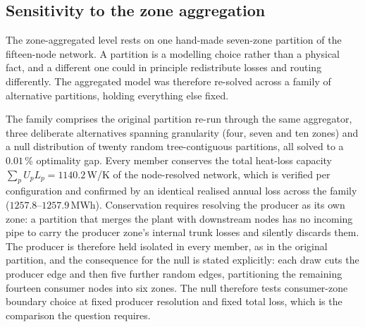 
\subsection{Sensitivity to the zone aggregation}
\label{subsec:clustering}

The zone-aggregated level rests on one hand-made seven-zone partition of the fifteen-node
network. A partition is a modelling choice rather than a physical fact, and a different one
could in principle redistribute losses and routing differently. The aggregated model was
therefore re-solved across a family of alternative partitions, holding everything else fixed.

The family comprises the original partition re-run through the same aggregator, three
deliberate alternatives spanning granularity (four, seven and ten zones) and a null
distribution of twenty random tree-contiguous partitions, all solved to a $0.01$\,\%
optimality gap. Every member conserves the total heat-loss capacity
$\sum_p U_p L_p = 1140.2$\,W/K of the node-resolved network, which is verified per
configuration and confirmed by an identical realised annual loss across the family
($1257.8$--$1257.9$\,MWh). Conservation requires resolving the producer as its own zone: a
partition that merges the plant with downstream nodes has no incoming pipe to carry the
producer zone's internal trunk losses and silently discards them. The producer is therefore held
isolated in every member, as in the original partition, and the consequence for the null is
stated explicitly: each draw cuts the producer edge and then
five further random edges, partitioning the remaining fourteen consumer nodes into six
zones. The null therefore tests consumer-zone boundary choice at fixed producer resolution
and fixed total loss, which is the comparison the question requires.

